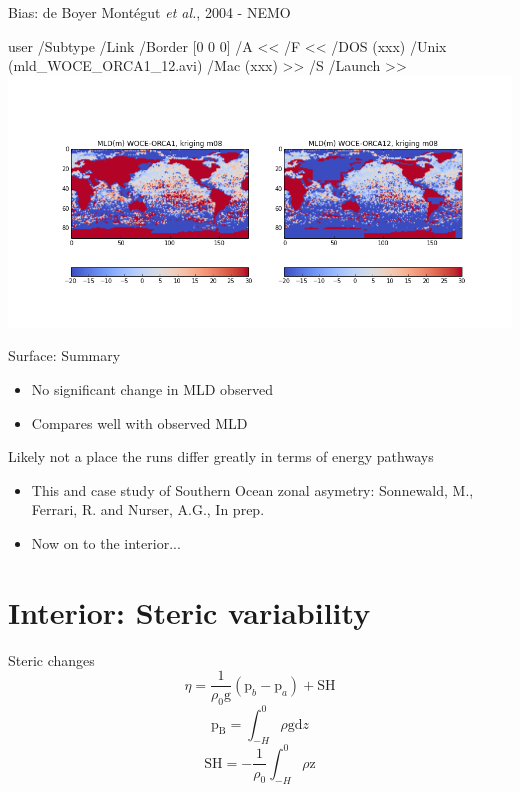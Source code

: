 \documentclass{beamer}
\newcommand{\LaunchBinary}[2]{%
  \leavevmode%
  \pdfstartlink user {
    /Subtype /Link
    /Border [0 0 0]%
    /A <<
      /F <<
         /DOS (xxx)
         /Unix (#1)
         /Mac (xxx)
      >>
      /S /Launch
    >>
  }#2%
  \pdfendlink%
}
\begin{document}
\begin{frame}{Bias: de Boyer Mont\'{e}gut \textit{et al.}, 2004 - NEMO}

\begin{center}
  \LaunchBinary{mld_WOCE_ORCA1_12.avi}{\includegraphics[width=1\textwidth]{mld_WOCE_ORCA1_12_m08.png}}%
\end{center}
\end{frame}

\begin{frame}{Surface: Summary}
\begin{itemize}
 \item No significant change in MLD observed
 \item Compares well with observed MLD
\end{itemize}
\pause
\begin{alertblock}{}
 Likely not a place the runs differ greatly in terms of energy pathways
\end{alertblock}
\pause
\begin{itemize}
 \item This and case study of Southern Ocean zonal asymetry: Sonnewald, M., Ferrari, R. and Nurser, A.G., In prep. 
 \item Now on to the interior...
\end{itemize}
\end{frame}


\section{Interior: Steric variability}

\begin{frame}{Steric changes}
 \begin{equation*}
 \eta = \dfrac{1}{\rho_{0}\mathrm{g}}\left( \mathrm{p}_{b}-\mathrm{p}_{a} \right) +\mathrm{SH}
\end{equation*}
\begin{equation*}
 \mathrm{p_{B}} = \int^{0}_{-H}  \rho \mathrm{g} \mathrm{d}z
\end{equation*}
 \begin{equation*}
 \mathrm{SH} = -\dfrac{1}{\rho_{0}}\int^{0}_{-H} \rho \mathrm{z}
\end{equation*}
\end{frame}
\end{document}
